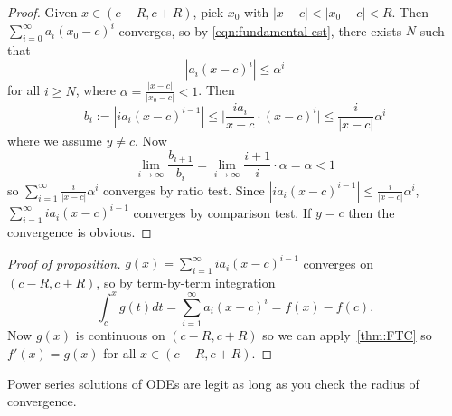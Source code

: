 \documentclass[a4paper]{article}
\theoremstyle{definition}
\begin{document}
\begin{proof}
  Given \(x\in(c-R,c+R)\), pick \(x_0\) with \(|x-c| < |x_0-c| < R\). Then \(\sum_{i=0}^{\infty}a_i(x_0-c)^i \) converges, so by \ref{eqn:fundamental est}, there exists \(N\) such that
  \[
    |a_i(x-c)^i| \leq \alpha^i
  \]
  for all \(i\geq N\), where \(\alpha = \frac{|x-c|}{|x_0-c|}<1\). Then
  \[
    b_i:= |i a_i (x-c)^{i-1}| \leq \Big| \frac{i a_i}{x-c}\cdot(x-c)^i \Big| \leq \frac{i}{|x-c|}\alpha^i
  \]
  where we assume \(y\neq c\). Now
  \[
    \lim_{i\to\infty} \frac{b_{i+1}}{b_i} = \lim_{i\to\infty} \frac{i+1}{i}\cdot\alpha = \alpha<1
  \]
  so \(\sum_{i=1}^{\infty}\frac{i}{|x-c|}\alpha^i \) converges by ratio test. Since \(|i a_i(x-c)^{i-1}| \leq \frac{i}{|x-c|}\alpha^i\), \(\sum_{i=1}^{\infty}i a_i(x-c)^{i-1} \) converges by comparison test. If \(y=c\) then the convergence is obvious.
\end{proof}

\begin{proof}[Proof of proposition]
  \(g(x) = \sum_{i=1}^{\infty}i a_i (x-c)^{i-1} \) converges on \((c-R,c+R)\), so by term-by-term integration
  \[
    \int_{c}^{x} g(t) dt = \sum_{i=1}^{\infty}a_i(x-c)^i = f(x) - f(c).
  \]
  Now \(g(x)\) is continuous on \((c-R, c+R)\) so we can apply~\ref{thm:FTC} so \(f'(x) = g(x)\) for all \(x\in(c-R,c+R)\).
\end{proof}

\begin{application}
  Power series solutions of ODEs are legit as long as you check the radius of convergence.
\end{application}
\end{document}
